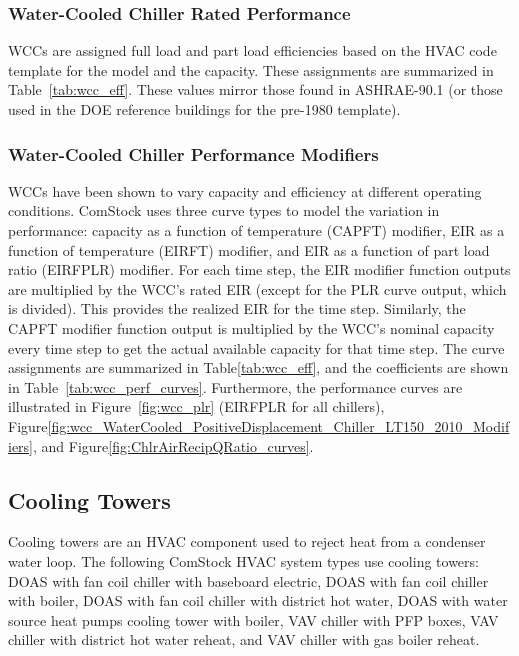 \subsubsection{Water-Cooled Chiller Rated Performance}

WCCs are assigned full load and part load efficiencies based on the HVAC code template for the model and the capacity. These assignments are summarized in Table~\ref{tab:wcc_eff}. These values mirror those found in ASHRAE-90.1 (or those used in the DOE reference buildings for the pre-1980 template).



\subsubsection{Water-Cooled Chiller Performance Modifiers}

WCCs have been shown to vary capacity and efficiency at different operating conditions. ComStock uses three curve types to model the variation in performance: capacity as a function of temperature (CAPFT) modifier, EIR as a function of temperature (EIRFT) modifier, and EIR as a function of part load ratio (EIRFPLR) modifier. For each time step, the EIR modifier function outputs are multiplied by the WCC's rated EIR (except for the PLR curve output, which is divided). This provides the realized EIR for the time step. Similarly, the CAPFT modifier function output is multiplied by the WCC's nominal capacity every time step to get the actual available capacity for that time step. The curve assignments are summarized in Table\ref{tab:wcc_eff}, and the coefficients are shown in Table~\ref{tab:wcc_perf_curves}. Furthermore, the performance curves are illustrated in Figure~\ref{fig:wcc_plr} (EIRFPLR for all chillers), Figure\ref{fig:wcc_WaterCooled_PositiveDisplacement_Chiller_LT150_2010_Modifiers}, and Figure\ref{fig:ChlrAirRecipQRatio_curves}.


\subsection{Cooling Towers}

Cooling towers are an HVAC component used to reject heat from a condenser water loop. The following ComStock HVAC system types use cooling towers: DOAS with fan coil chiller with baseboard electric, DOAS with fan coil chiller with boiler, DOAS with fan coil chiller with district hot water, DOAS with water source heat pumps cooling tower with boiler, VAV chiller with PFP boxes, VAV chiller with district hot water reheat, and VAV chiller with gas boiler reheat.

